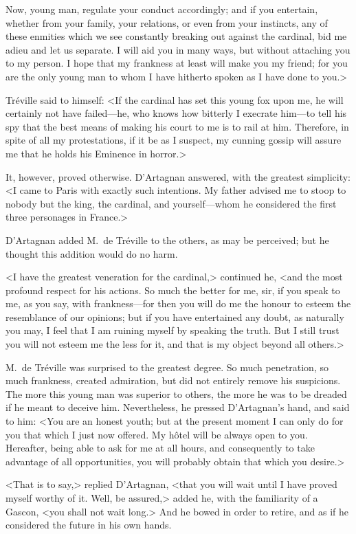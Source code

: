 Now, young man, regulate your conduct accordingly; and if you entertain, whether from your family, your relations, or even from your instincts, any of these enmities which we see constantly breaking out against the cardinal, bid me adieu and let us separate. I will aid you in many ways, but without attaching you to my person. I hope that my frankness at least will make you my friend; for you are the only young man to whom I have hitherto spoken as I have done to you.> 

Tréville said to himself: <If the cardinal has set this young fox upon me, he will certainly not have failed—he, who knows how bitterly I execrate him—to tell his spy that the best means of making his court to me is to rail at him. Therefore, in spite of all my protestations, if it be as I suspect, my cunning gossip will assure me that he holds his Eminence in horror.> 

It, however, proved otherwise. D'Artagnan answered, with the greatest simplicity: <I came to Paris with exactly such intentions. My father advised me to stoop to nobody but the king, the cardinal, and yourself—whom he considered the first three personages in France.> 

D'Artagnan added M.~de Tréville to the others, as may be perceived; but he thought this addition would do no harm. 

<I have the greatest veneration for the cardinal,> continued he, <and the most profound respect for his actions. So much the better for me, sir, if you speak to me, as you say, with frankness—for then you will do me the honour to esteem the resemblance of our opinions; but if you have entertained any doubt, as naturally you may, I feel that I am ruining myself by speaking the truth. But I still trust you will not esteem me the less for it, and that is my object beyond all others.> 

M.~de Tréville was surprised to the greatest degree. So much penetration, so much frankness, created admiration, but did not entirely remove his suspicions. The more this young man was superior to others, the more he was to be dreaded if he meant to deceive him. Nevertheless, he pressed D'Artagnan's hand, and said to him: <You are an honest youth; but at the present moment I can only do for you that which I just now offered. My hôtel will be always open to you. Hereafter, being able to ask for me at all hours, and consequently to take advantage of all opportunities, you will probably obtain that which you desire.> 

<That is to say,> replied D'Artagnan, <that you will wait until I have proved myself worthy of it. Well, be assured,> added he, with the familiarity of a Gascon, <you shall not wait long.> And he bowed in order to retire, and as if he considered the future in his own hands. 

